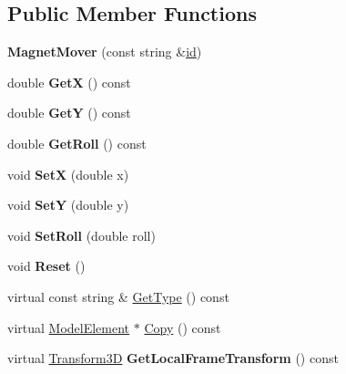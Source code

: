 \subsection*{Public Member Functions}
\begin{DoxyCompactItemize}
\item 
\mbox{\label{classMagnetMover_a7522b2315a8ce3a01f20f9584fcad3c5}} 
{\bfseries Magnet\+Mover} (const string \&\hyperlink{classModelElement_aada171ead2085c75b592cf07d91bc5c2}{id})
\item 
\mbox{\label{classMagnetMover_a2f5aa9a59c7ba1be65b15e3aeffb5d6e}} 
double {\bfseries GetX} () const
\item 
\mbox{\label{classMagnetMover_a989e79711f3328f8f7421091c3ffd2ee}} 
double {\bfseries GetY} () const
\item 
\mbox{\label{classMagnetMover_a008127e73af03536a65653c7a16355d1}} 
double {\bfseries Get\+Roll} () const
\item 
\mbox{\label{classMagnetMover_aa86a36cec8e640663afdf8a6ac7e1ec8}} 
void {\bfseries SetX} (double x)
\item 
\mbox{\label{classMagnetMover_afeba622e8e6e614cac77d86c12c54c33}} 
void {\bfseries SetY} (double y)
\item 
\mbox{\label{classMagnetMover_a0d48dd351523f3ce0484ec5b027abab8}} 
void {\bfseries Set\+Roll} (double roll)
\item 
\mbox{\label{classMagnetMover_a506b27917ba29d7de07fbfb72b3a1066}} 
void {\bfseries Reset} ()
\item 
virtual const string \& \hyperlink{classMagnetMover_a01e7a7b50824532e141fa18ba58c2758}{Get\+Type} () const
\item 
virtual \hyperlink{classModelElement}{Model\+Element} $\ast$ \hyperlink{classMagnetMover_aff87bd41b6b3f0e158ccfd4f2a03aaf5}{Copy} () const
\item 
\mbox{\label{classMagnetMover_a7bfb101314ef1fb40cd1447d36463dee}} 
virtual \hyperlink{classTransform3D}{Transform3D} {\bfseries Get\+Local\+Frame\+Transform} () const
\end{DoxyCompactItemize}
